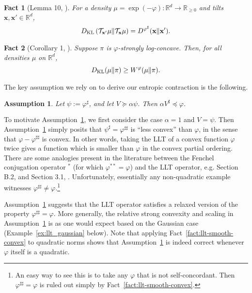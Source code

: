\documentclass[11pt]{article}
\newtheorem{fact}{Fact}
\newtheorem{assumption}{Assumption}
\newcommand{\defeq}{:=}
\newcommand{\R}{\mathbb{R}}
\newcommand{\Par}[1]{\left(#1\right)}
\newcommand{\0}{\mathbf{0}}
\newcommand{\1}{\mathbf{1}}
\newcommand{\vx}{\mathbf{x}}
\newcommand{\tilt}{\mathcal{T}}
\newcommand{\vhi}{\varphi}
\newcommand{\dkl}{D_{\textup{KL}}}
\begin{document}
\begin{fact}[Lemma 10, \cite{GopiLLST25}]\label{fact:kld_breg}
For a density $\mu =\exp(-\vhi): \R^d \to \R_{\ge 0}$ and tilts $\vx, \vx' \in \R^d$,
\[\dkl\Par{\tilt_{\vx'}\mu \| \tilt_{\vx}\mu} = D^{\vhi^\sharp}(\vx \| \vx'). \]
\end{fact}

\begin{fact}[Corollary 1, \cite{AhnC21}]\label{fact:slc}
    Suppose $\pi$ is $\vhi$-strongly log-concave. Then, for all densities $\mu$ on $\R^d$, \[
    \dkl(\mu\|\pi)\ge W^\vhi(\mu\|\pi).
    \]
\end{fact}

The key assumption we rely on to derive our entropic contraction is the following.

\begin{assumption}\label{assume:llt}
Let $\psi \defeq \vhi^\sharp$, and let $V \succeq \alpha \psi$. Then $\alpha V^\sharp \preceq \vhi$.
\end{assumption}

To motivate Assumption~\ref{assume:llt}, we first consider the case $\alpha  = 1$ and $V = \psi$. Then Assumption~\ref{assume:llt} simply posits that $\psi^\sharp = \vhi^{\sharp\sharp}$ is ``less convex'' than $\vhi$, in the sense that $\vhi - \vhi^{\sharp\sharp}$ is convex. In other words, taking the LLT of a convex function $\vhi$ twice gives a function which is smaller than $\vhi$ in the convex partial ordering. There are some analogies present in the literature between the Fenchel conjugation operator $^*$ (for which $\vhi^{**} = \vhi$) and the LLT operator, e.g. Section B.2, \cite{ChenCSW22} and Section 3.1, \cite{GopiLLST25}. Unfortunately, essentially any non-quadratic example witnesses $\vhi^{\sharp\sharp} \neq \vhi$.\footnote{An easy way to see this is to take any $\vhi$ that is not self-concordant. Then $\vhi^{\sharp\sharp} = \vhi$ is ruled out simply by Fact~\ref{fact:llt-smooth-convex}.}

Assumption~\ref{assume:llt} suggests that the LLT operator satisfies a relaxed version of the property $\vhi^{\sharp\sharp} = \vhi$. More generally, the relative strong convexity and scaling in Assumption~\ref{assume:llt} is as one would expect based on the Gaussian case (Example~\ref{ex:llt_gaussian} below). Note that applying Fact~\ref{fact:llt-smooth-convex} to quadratic norms shows that Assumption~\ref{assume:llt} is indeed correct whenever $\vhi$ itself is a quadratic.
\end{document}
